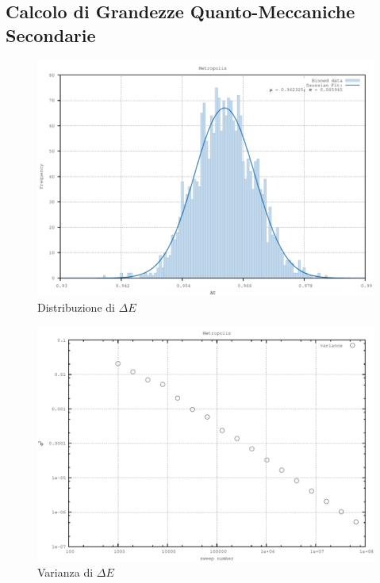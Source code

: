 \subsection{Calcolo di Grandezze Quanto-Meccaniche Secondarie}

\begin{figure}[H]
\centering
\includegraphics[width=\textwidth]{histogram}
\caption{Distribuzione di $\Delta E$}
\label{fig:histogram}
\end{figure}

\begin{figure}[H]
\centering
\includegraphics[width=\textwidth]{variance}
\caption{Varianza di $\Delta E$}
\label{fig:variance}
\end{figure}


